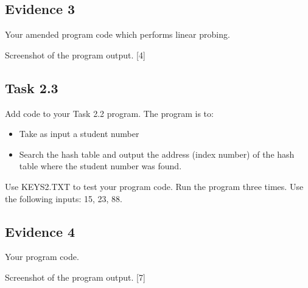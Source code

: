 \subsection*{Evidence 3}

Your amended program code which performs linear probing. 

Screenshot of the program output. \hfill{}{[}4{]}

\subsection*{Task 2.3 }

Add code to your Task 2.2 program. The program is to: 
\begin{itemize}
\item Take as input a student number 
\item Search the hash table and output the address (index number) of the
hash table where the student number was found.
\end{itemize}
Use KEYS2.TXT to test your program code. Run the program three times.
Use the following inputs: 15, 23, 88. 

\subsection*{Evidence 4}

Your program code.

Screenshot of the program output.\hfill{} {[}7{]}